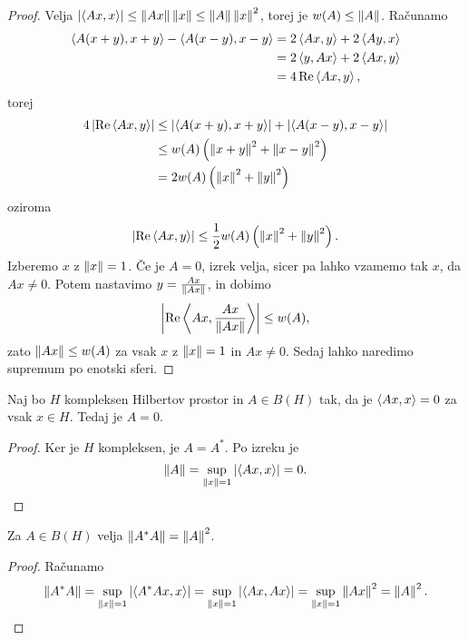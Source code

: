 \begin{proof}
  Velja $\left| \left< Ax,x \right> \right| \le \left\lVert Ax\right\rVert \left\lVert x\right\rVert \le \left\lVert A\right\rVert \left\lVert x\right\rVert^2$, torej
  je $w(A) \le \left\lVert A\right\rVert$.
  Računamo
  \begin{align*}
	\left< A(x+y), x+y \right> - \left< A(x-y), x-y \right>
	&= 2 \left< Ax,y \right> + 2 \left< Ay,x \right> \\
	&= 2 \left< y,Ax \right> + 2 \left< Ax,y \right> \\
	&= 4 \operatorname{Re} \left< Ax,y \right>,
  \end{align*}
  torej
  \begin{align*}
	4 \left| \operatorname{Re} \left< Ax,y \right> \right|
	&\le \left| \left< A(x+y), x+y \right> \right| + \left| \left< A(x-y), x-y \right> \right| \\
	&\le w(A) \left( \left\lVert x+y\right\rVert^2 + \left\lVert x-y\right\rVert^2 \right) \\
	&= 2 w(A) \left( \left\lVert x\right\rVert^2 + \left\lVert y\right\rVert^2 \right)
  \end{align*}
  oziroma
  \[
	\left| \operatorname{Re} \left< Ax,y \right> \right| \le \frac{1}{2} w(A) \left( \left\lVert x\right\rVert^2 + \left\lVert y\right\rVert^2 \right).
  \]
  Izberemo $x$ z $\left\lVert x\right\rVert = 1$.
  Če je $A = 0$, izrek velja, sicer pa lahko vzamemo tak $x$, da $Ax \ne 0$.
  Potem nastavimo $y = \frac{Ax}{\left\lVert Ax\right\rVert}$, in dobimo
  \[
	\left| \operatorname{Re} \left< Ax, \frac{Ax}{\left\lVert Ax\right\rVert} \right> \right| \le w(A),
  \]
  zato $\left\lVert Ax\right\rVert \le w(A)$ za vsak $x$ z $\left\lVert x\right\rVert = 1$ in $Ax \ne 0$.
  Sedaj lahko naredimo supremum po enotski sferi.
\end{proof}


\begin{trditev}
  Naj bo $H$ kompleksen Hilbertov prostor in $A \in B(H)$ tak, da je $\left< Ax,x \right>
  = 0$ za vsak $x \in H$.
  Tedaj je $A = 0$.
\end{trditev}

\begin{proof}
  Ker je $H$ kompleksen, je $A = A^*$.
  Po izreku je
  \[
	\left\lVert A\right\rVert = \sup_{\left\lVert x\right\rVert = 1} \left| \left< Ax,x \right> \right| = 0.
	\qedhere
  \]
\end{proof}

\begin{izrek}
  Za $A \in B(H)$ velja $\left\lVert A^* A\right\rVert = \left\lVert A\right\rVert^2$.
\end{izrek}

\begin{proof}
  Računamo
  \[
	\left\lVert A^* A\right\rVert
	= \sup_{\left\lVert x\right\rVert = 1} \left| \left< A^* Ax, x \right> \right|
	= \sup_{\left\lVert x\right\rVert = 1} \left| \left< Ax, Ax \right> \right|
	= \sup_{\left\lVert x\right\rVert = 1} \left\lVert Ax\right\rVert^2
	= \left\lVert A\right\rVert^2.
	\qedhere
  \]
\end{proof}

